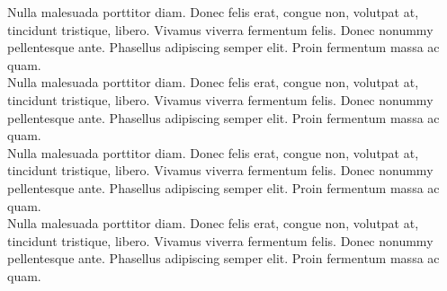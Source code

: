 \documentclass[theme]{cv_einstein}
\begin{document}
\begin{paracol}{2}
\begin{rightcolumn}
            \vspace{\sectionspace}
            {Nulla malesuada porttitor diam. Donec felis erat, congue non, volutpat at, tincidunt tristique, libero. Vivamus viverra fermentum felis. Donec nonummy pellentesque ante. Phasellus adipiscing semper elit. Proin fermentum massa ac quam.}
            \vspace{\itemspace}\\
            {Nulla malesuada porttitor diam. Donec felis erat, congue non, volutpat at, tincidunt tristique, libero. Vivamus viverra fermentum felis. Donec nonummy pellentesque ante. Phasellus adipiscing semper elit. Proin fermentum massa ac quam.}
            \vspace{\itemspace}\\
            {Nulla malesuada porttitor diam. Donec felis erat, congue non, volutpat at, tincidunt tristique, libero. Vivamus viverra fermentum felis. Donec nonummy pellentesque ante. Phasellus adipiscing semper elit. Proin fermentum massa ac quam.}
            \vspace{\itemspace}\\
            {Nulla malesuada porttitor diam. Donec felis erat, congue non, volutpat at, tincidunt tristique, libero. Vivamus viverra fermentum felis. Donec nonummy pellentesque ante. Phasellus adipiscing semper elit. Proin fermentum massa ac quam.}


\end{rightcolumn}
\end{paracol}
\end{document}
